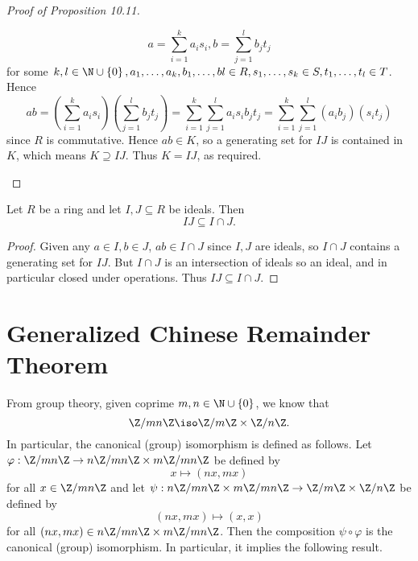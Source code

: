 \documentclass[pmath347]{subfiles}
\begin{document}
\begin{proof}[Proof of Proposition 10.11]
\begin{enumerate}
                \begin{equation*}
                    a = \sum^{k}_{i=1} a_is_i, b = \sum^{l}_{j=1} b_jt_j
                \end{equation*}
                for some $k,l\in\N\cup\left\lbrace 0 \right\rbrace , a_1,\ldots,a_k,b_1,\ldots,bl\in R, s_1,\ldots,s_k\in S, t_1,\ldots,t_l\in T$. Hence
                \begin{equation*}
                    ab = \left( \sum^{k}_{i=1} a_is_i \right) \left( \sum^{l}_{j=1} b_jt_j \right) = \sum^{k}_{i=1} \sum^{l}_{j=1} a_is_ib_jt_j = \sum^{k}_{i=1} \sum^{l}_{j=1} \left( a_ib_j \right) \left( s_it_j \right) 
                \end{equation*}
                since $R$ is commutative. Hence $ab\in K$, so a generating set for $IJ$ is contained in $K$, which means $K\supseteq IJ$. Thus $K=IJ$, as required. \qqedsym
        \end{enumerate}
    \end{proof}
    
    \begin{prop}{}
        Let $R$ be a ring and let $I,J\subseteq R$ be ideals. Then
        \begin{equation*}
            IJ\subseteq I\cap J.
        \end{equation*}
    \end{prop}

    \begin{proof}
        Given any $a\in I, b\in J$, $ab\in I\cap J$ since $I,J$ are ideals, so $I\cap J$ contains a generating set for $IJ$. But $I\cap J$ is an intersection of ideals so an ideal, and in particular closed under operations. Thus $IJ\subseteq I\cap J$.
    \end{proof}

    \section{Generalized Chinese Remainder Theorem}

    From group theory, given coprime $m,n\in\N\cup\left\lbrace 0 \right\rbrace$, we know that
    \begin{equation*}
        \Z /mn\Z\iso \Z /m\Z\times\Z /n\Z.
    \end{equation*}
    In particular, the canonical (group) isomorphism is defined as follows. Let $\varphi:\Z/ mn\Z\to n\Z /mn\Z\times m\Z /mn\Z$ be defined by
    \begin{equation*}
        x\mapsto \left( nx,mx \right) 
    \end{equation*}
    for all $x\in \Z /mn\Z$ and let $\psi:n\Z /mn\Z\times m\Z /mn\Z\to \Z /m\Z\times \Z /n\Z$ be defined by
    \begin{equation*}
        \left( nx,mx \right) \mapsto \left( x,x \right) 
    \end{equation*}
    for all $\left( nx,mx \right) \in n\Z /mn\Z\times m\Z /mn\Z$. Then the composition $\psi\circ\varphi$ is the canonical (group) isomorphism. In particular, it implies the following result.
\end{document}
